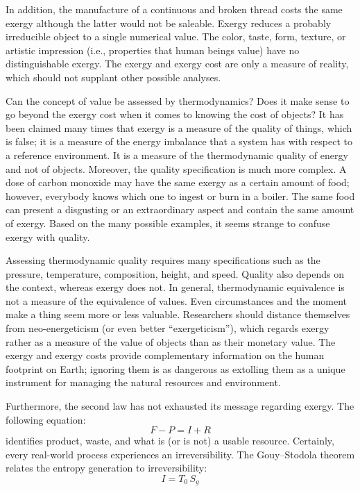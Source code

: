 \documentclass[energies,article,submit,moreauthors,pdftex]{Definitions/mdpi}
\begin{document}
In addition, the manufacture of a continuous and broken thread costs the same exergy although the latter would not be saleable. Exergy reduces a probably irreducible object to a single numerical value. The color, taste, form, texture, or artistic impression (i.e., properties that human beings value) have no distinguishable exergy. The exergy and exergy cost are only a measure of reality, which should not supplant other possible analyses.

Can the concept of value be assessed by thermodynamics? Does it make sense to go beyond the exergy cost when it comes to knowing the cost of objects? It has been claimed many times that exergy is a measure of the quality of things, which is false; it is a measure of the energy imbalance that a system has with respect to a reference environment. It is a measure of the thermodynamic quality of energy and not of objects. Moreover, the quality specification is much more complex. A dose of carbon monoxide may have the same exergy as a certain amount of food; however, everybody knows which one to ingest or burn in a boiler. The same food can present a disgusting or an extraordinary aspect and contain the same amount of exergy. Based on the many possible examples, it seems strange to confuse exergy with quality.

Assessing thermodynamic quality requires many specifications such as the pressure, temperature, composition, height, and speed. Quality also depends on the context, whereas exergy does not. In general, thermodynamic equivalence is not a measure of the equivalence of values. Even circumstances and the moment make a thing seem more or less valuable. Researchers should distance themselves from neo-energeticism (or even better “exergeticism”), which regards exergy rather as a measure of the value of objects than as their monetary value. The exergy and exergy costs provide complementary information on the human footprint on Earth; ignoring them is as dangerous as extolling them as a unique instrument for managing the natural resources and environment.
 
Furthermore, the second law has not exhausted its message regarding exergy. The following equation:
\begin{equation}
   F - P = I + R
\label{eq:FPR}
\end{equation}
identifies product, waste, and what is (or is not) a usable resource. Certainly, every real-world process experiences an irreversibility. The Gouy–Stodola theorem relates the entropy generation to irreversibility:
\begin{equation}
    I = T_0\,S_g
\label{eq:gouystodola}
\end{equation}
\end{document}

